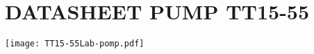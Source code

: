 \chapter{DATASHEET PUMP TT15-55}\label{app:pump}
\begin{center}
  \texttt{[image: TT15-55Lab-pomp.pdf]}
\end{center}
